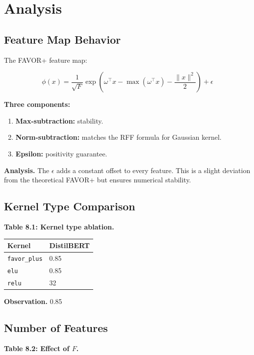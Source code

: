 
\section{Analysis}

\subsection{Feature Map Behavior}

The FAVOR+ feature map:

\[
\phi(x) = \frac{1}{\sqrt{F}} \exp\!\left(\omega^\top x - \max(\omega^\top x) - \frac{\|x\|^2}{2}\right) + \epsilon
\]

\textbf{Three components:}
\begin{enumerate}
\item \textbf{Max-subtraction:} stability.
\item \textbf{Norm-subtraction:} matches the RFF formula for Gaussian kernel.
\item \textbf{Epsilon:} positivity guarantee.

\end{enumerate}
\textbf{Analysis.} The $\epsilon$ adds a constant offset to every feature. This 
is a slight deviation from the theoretical FAVOR+ but ensures numerical 
stability.

\subsection{Kernel Type Comparison}

\textbf{Table 8.1: Kernel type ablation.}

\begin{table}[H]
\centering
\small
\begin{tabular}{ll}
\toprule
\textbf{Kernel} & \textbf{DistilBERT} \\
\midrule
\texttt{favor\_plus} & 0.85 \\
\texttt{elu} & 0.85 \\
\texttt{relu} & 32 \\
\bottomrule
\end{tabular}
\end{table}

\textbf{Observation.} 0.85

\subsection{Number of Features}

\textbf{Table 8.2: Effect of $F$.}

